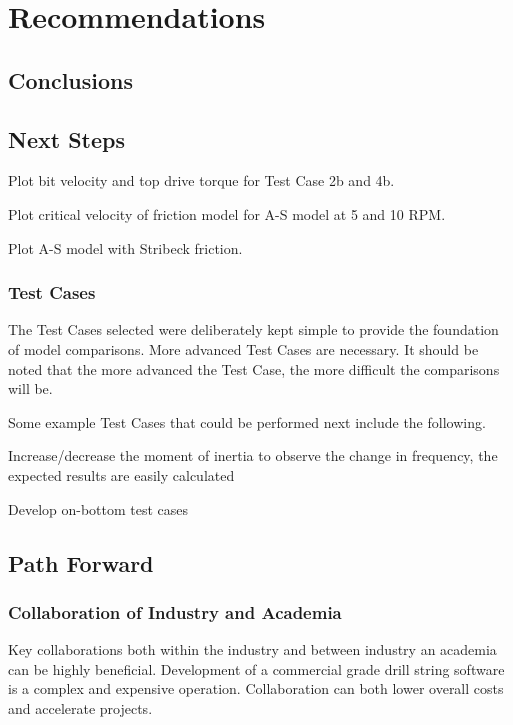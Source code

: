 \chapter{Recommendations}
\section{Conclusions}

\section{Next Steps}
\begin{bulletedlist}
	\item Plot bit velocity and top drive torque for Test Case 2b and 4b.
	\item Plot critical velocity of friction model for A-S model at 5 and 10 RPM.
	\item Plot A-S model with Stribeck friction.
\end{bulletedlist}

\subsection{Test Cases}
The Test Cases selected were deliberately kept simple to provide the foundation of model comparisons.  More advanced Test Cases are necessary.  It should be noted that the more advanced the Test Case, the more difficult the comparisons will be.

Some example Test Cases that could be performed next include the following.
\begin{bulletedlist}
	\item Increase/decrease the moment of inertia to observe the change in frequency, the expected results are easily calculated
	\item Develop on-bottom test cases
\end{bulletedlist}

\section{Path Forward}
\subsection{Collaboration of Industry and Academia}
Key collaborations both within the industry and between industry an academia can be highly beneficial.  Development of a commercial grade drill string software is a complex and expensive operation.  Collaboration can both lower overall costs and accelerate projects.

